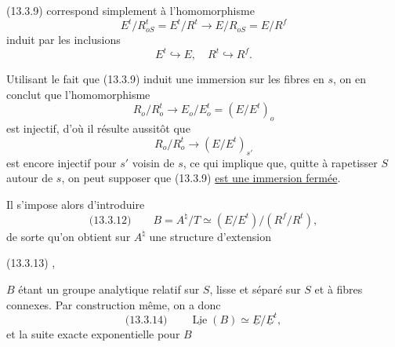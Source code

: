 
(13.3.9) correspond simplement à l'homomorphisme
\[
E^t/R_{oS}^t=E^t/R^t\longrightarrow E/R_{oS}=E/R^f
\]
induit par les inclusions
\[
E^t\hookrightarrow E,\quad R^t\hookrightarrow R^f.
\]

Utilisant le fait que (13.3.9) induit une immersion sur les fibres en $s$, on en conclut que l'homomorphisme
\[
R_o/R_o^t\longrightarrow E_o/E_o^t=(E/E^t)_o
\]
est injectif, d'où il résulte aussitôt que
\[
R_o/R_o^t\longrightarrow(E/E^t)_{s'}
\]
est encore injectif pour $s'$ voisin de $s$, ce qui implique que, quitte à rapetisser $S$ autour de $s$, on peut supposer que (13.3.9) \uline{est une immersion fermée}.

Il s'impose alors d'introduire
\[
\text{(13.3.12)}\qquad B=A^\natural/T\simeq(E/E^t)/(R^f/R^t),
\]
de sorte qu'on obtient sur $A^\natural$ une structure d'extension

(13.3.13)
,

$B$ étant un groupe analytique relatif sur $S$, lisse et séparé sur $S$ et à fibres connexes. Par construction même, on a donc
\[
\text{(13.3.14)}\qquad \underline{\operatorname{Lie}}(B)\simeq\underline E/\underline E^t,
\]
et la suite exacte exponentielle pour $B$

